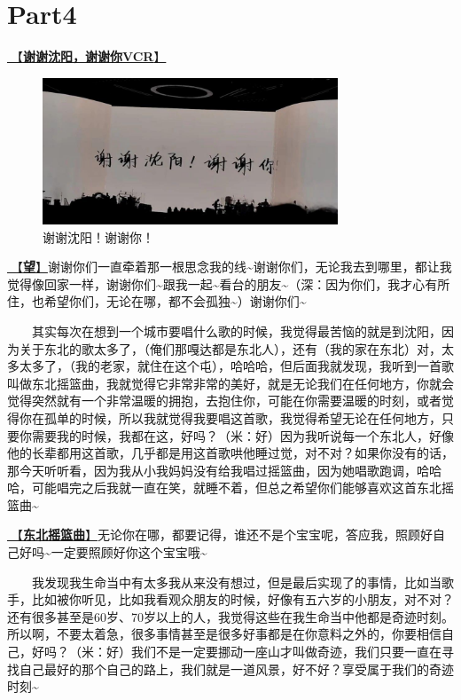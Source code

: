 \documentclass[]{ctexbook}
\begin{document}
\section{Part4}\label{shenyang-20240907-part4}

\hyperref[thank-you-vcr]{🎥【\textbf{谢谢沈阳，谢谢你VCR}】}

\begin{figure}

{\centering \includegraphics[width=250pt]{img/shenyang20240907/thank-shenyang} 

}

\caption{谢谢沈阳！谢谢你！}\label{fig:unnamed-chunk-85}
\end{figure}

\hyperref[hope]{🎵【\textbf{望}】}谢谢你们一直牵着那一根思念我的线\textasciitilde 谢谢你们，无论我去到哪里，都让我觉得像回家一样，谢谢你们\textasciitilde 跟我一起\textasciitilde 看台的朋友\textasciitilde（深：因为你们，我才心有所住，也希望你们，无论在哪，都不会孤独\textasciitilde）谢谢你们\textasciitilde{}

  其实每次在想到一个城市要唱什么歌的时候，我觉得最苦恼的就是到沈阳，因为关于东北的歌太多了，（俺们那嘎达都是东北人），还有（我的家在东北）对，太多太多了，（我的老家，就住在这个屯），哈哈哈，但后面我就发现，我听到一首歌叫做东北摇篮曲，我就觉得它非常非常的美好，就是无论我们在任何地方，你就会觉得突然就有一个非常温暖的拥抱，去抱住你，可能在你需要温暖的时刻，或者觉得你在孤单的时候，所以我就觉得我要唱这首歌，我觉得希望无论在任何地方，只要你需要我的时候，我都在这，好吗？（米：好）因为我听说每一个东北人，好像他的长辈都用这首歌，几乎都是用这首歌哄他睡过觉，对不对？如果你没有的话，那今天听听看，因为我从小我妈妈没有给我唱过摇篮曲，因为她唱歌跑调，哈哈哈，可能唱完之后我就一直在笑，就睡不着，但总之希望你们能够喜欢这首东北摇篮曲\textasciitilde{}

\hyperref[lullaby]{🎵【\textbf{东北摇篮曲}】}无论你在哪，都要记得，谁还不是个宝宝呢，答应我，照顾好自己好吗\textasciitilde 一定要照顾好你这个宝宝哦\textasciitilde{}

  我发现我生命当中有太多我从来没有想过，但是最后实现了的事情，比如当歌手，比如被你听见，比如我看观众朋友的时候，好像有五六岁的小朋友，对不对？还有很多甚至是60岁、70岁以上的人，我觉得这些在我生命当中他都是奇迹时刻。所以啊，不要太着急，很多事情甚至是很多好事都是在你意料之外的，你要相信自己，好吗？（米：好）我们不是一定要挪动一座山才叫做奇迹，我们只要一直在寻找自己最好的那个自己的路上，我们就是一道风景，好不好？享受属于我们的奇迹时刻\textasciitilde{}
\end{document}
